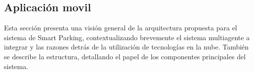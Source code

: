 \clearpage

\subsection{Aplicación movil}
Esta sección presenta una visión general de la arquitectura propuesta para el sistema de Smart Parking, contextualizando brevemente el sistema multiagente a integrar y las razones detrás de la utilización de tecnologías en la nube. También se describe la estructura, detallando el papel de los componentes principales del sistema.

